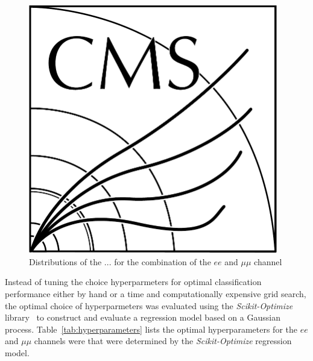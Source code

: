 \begin{figure}[tbp]
\centering
\includegraphics[width=0.97\textwidth]{CMS-bw-logo.pdf}
\caption{
Distributions of the ... for the combination of the $ee$ and $\mu\mu$ channel}
\label{fig:inputFeaturesDataSimAgreement}
\end{figure}

Instead of tuning the choice hyperparmeters for optimal classification performance either by hand or a time and computationally expensive grid search, the optimal choice of hyperparmeters was evaluated using the \emph{Scikit-Optimize} library~\cite{scikit-optimise} to construct and evaluate a regression model based on a Gaussian process.
Table~\ref{tab:hyperparameters} lists the optimal hyperparameters for the $ee$ and $\mu\mu$ channels were that were determined by the \emph{Scikit-Optimize} regression model.

